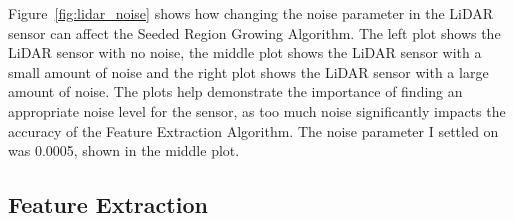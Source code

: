 \documentclass[12pt]{article}
\begin{document}
Figure~\ref{fig:lidar_noise} shows how changing the noise parameter in the LiDAR sensor can affect the Seeded Region Growing
Algorithm. The left plot shows the LiDAR sensor with no noise, the middle plot shows the LiDAR sensor with a small amount of
noise and the right plot shows the LiDAR sensor with a large amount of noise. The plots help demonstrate the importance of
finding an appropriate noise level for the sensor, as too much noise significantly impacts the accuracy of the Feature Extraction
Algorithm. The noise parameter I settled on was 0.0005, shown in the middle plot.\\

\subsection{Feature Extraction}
\end{document}
